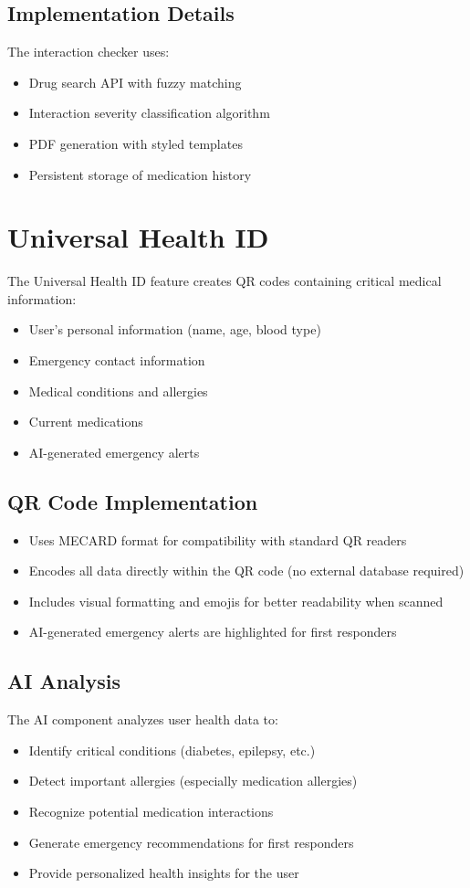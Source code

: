 \documentclass[12pt,a4paper]{report}
\begin{document}
\subsection{Implementation Details}
The interaction checker uses:
\begin{itemize}
    \item Drug search API with fuzzy matching
    \item Interaction severity classification algorithm
    \item PDF generation with styled templates
    \item Persistent storage of medication history
\end{itemize}

\section{Universal Health ID}
The Universal Health ID feature creates QR codes containing critical medical information:
\begin{itemize}
    \item User's personal information (name, age, blood type)
    \item Emergency contact information
    \item Medical conditions and allergies
    \item Current medications
    \item AI-generated emergency alerts
\end{itemize}

\subsection{QR Code Implementation}
\begin{itemize}
    \item Uses MECARD format for compatibility with standard QR readers
    \item Encodes all data directly within the QR code (no external database required)
    \item Includes visual formatting and emojis for better readability when scanned
    \item AI-generated emergency alerts are highlighted for first responders
\end{itemize}

\subsection{AI Analysis}
The AI component analyzes user health data to:
\begin{itemize}
    \item Identify critical conditions (diabetes, epilepsy, etc.)
    \item Detect important allergies (especially medication allergies)
    \item Recognize potential medication interactions
    \item Generate emergency recommendations for first responders
    \item Provide personalized health insights for the user
\end{itemize}
\end{document}
